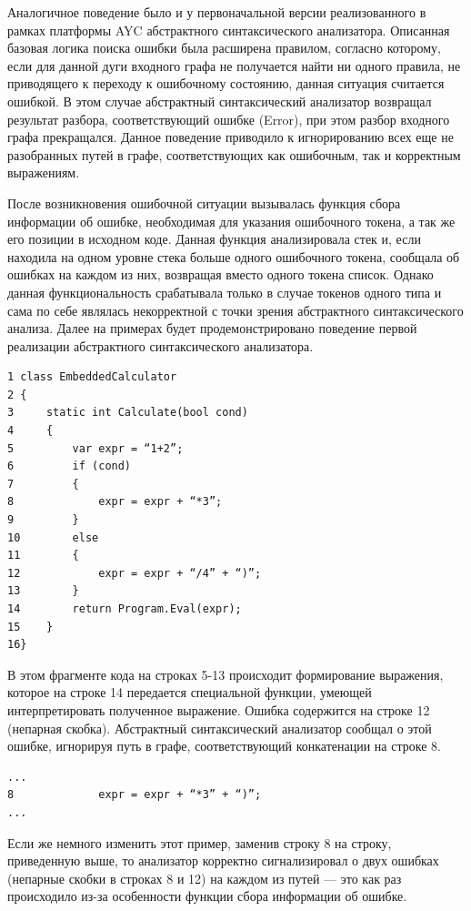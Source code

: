 Аналогичное поведение было и у первоначальной версии реализованного в рамках 
платформы AYC абстрактного синтаксического анализатора. Описанная базовая логика 
поиска ошибки была расширена правилом, согласно которому, если для данной дуги 
входного графа не получается найти ни одного правила, не приводящего к переходу 
к ошибочному состоянию, данная ситуация считается ошибкой. В этом случае абстрактный 
синтаксический анализатор возвращал результат разбора, соответствующий ошибке 
(Error), при этом разбор входного графа прекращался. Данное поведение приводило 
к игнорированию всех еще не разобранных путей в графе, соответствующих как ошибочным, 
так и корректным выражениям. 

После возникновения ошибочной ситуации вызывалась функция сбора информации об 
ошибке, необходимая для указания ошибочного токена, а так же его позиции в исходном 
коде. Данная функция анализировала стек и, если находила на одном уровне стека 
больше одного ошибочного токена, сообщала об ошибках на каждом из них, возвращая 
вместо одного токена список. Однако данная функциональность срабатывала только в 
случае токенов одного типа и сама по себе являлась некорректной с точки зрения 
абстрактного синтаксического анализа. Далее на примерах будет продемонстрировано 
поведение первой реализации абстрактного синтаксического анализатора.

\begin{verbatim}
1 class EmbeddedCalculator 
2 {
3     static int Calculate(bool cond)
4     {
5         var expr = “1+2”;
6         if (cond)
7         {
8             expr = expr + “*3”; 
9         }
10        else
11        {
12            expr = expr + “/4” + “)”;
13        }
14        return Program.Eval(expr);
15    }
16}
\end{verbatim}

В этом фрагменте кода на строках 5-13 происходит формирование выражения, которое  
на строке 14 передается специальной функции, умеющей интерпретировать полученное 
выражение. Ошибка содержится на строке 12 (непарная скобка). Абстрактный синтаксический 
анализатор сообщал о этой ошибке, игнорируя путь в графе, соответствующий конкатенации 
на строке 8.

\begin{verbatim}
...
8             expr = expr + “*3” + “)”; 
...
\end{verbatim}

Если же немного изменить этот пример, заменив строку 8 на строку, приведенную выше, 
то анализатор корректно сигнализировал о двух ошибках (непарные скобки в строках 
8 и 12) на каждом из путей — это как раз происходило из-за особенности функции 
сбора информации об ошибке.

